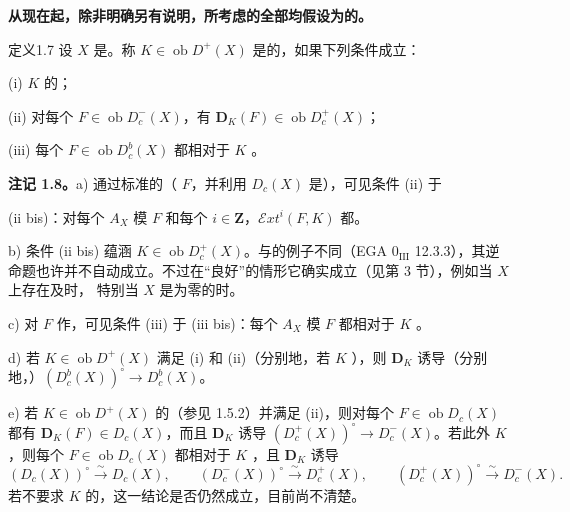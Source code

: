 \textbf{从现在起，除非明确另有说明，所考虑的全部均假设为的。}

\begin{SGAresult}{定义}{1.7}
设 $X$ 是。称 $K\in\operatorname{ob}D^+(X)$ 是的，如果下列条件成立：

(i) $K$ 的；

(ii) 对每个 $F\in\operatorname{ob}D_c^-(X)$，有 $\mathbf D_K(F)\in\operatorname{ob}D_c^+(X)$；

(iii) 每个 $F\in\operatorname{ob}D_c^b(X)$ 都相对于 $K$ 。
\end{SGAresult}
\textbf{注记 1.8。}a) 通过标准的（ $F$，并利用 $D_c(X)$ 是），可见条件 (ii) 于

(ii bis)：对每个 $A_X$ 模 $F$ 和每个 $i\in\mathbf Z$，$\mathcal Ext^i(F,K)$ 都。

b) 条件 (ii bis) 蕴涵 $K\in\operatorname{ob}D_c^+(X)$。与的例子不同（EGA $0_{\mathrm{III}}$ 12.3.3），其逆命题也许并不自动成立。不过在“良好”的情形它确实成立（见第 3 节），例如当 $X$ 上存在及时，
特别当 $X$ 是为零的时。

c) 对 $F$ 作，可见条件 (iii) 于 (iii bis)：每个 $A_X$ 模 $F$ 都相对于 $K$ 。

d) 若 $K\in\operatorname{ob}D^+(X)$ 满足 (i) 和 (ii)（分别地，若 $K$ ），则 $\mathbf D_K$ 诱导（分别地，）$(D_c^b(X))^\circ\longrightarrow D_c^b(X)$。

e) 若 $K\in\operatorname{ob}D^+(X)$ 的（参见 1.5.2）并满足 (ii)，则对每个 $F\in\operatorname{ob}D_c(X)$ 都有 $\mathbf D_K(F)\in D_c(X)$，而且 $\mathbf D_K$ 诱导 $(D_c^+(X))^\circ\longrightarrow D_c^-(X)$。若此外 $K$ ，则每个 $F\in\operatorname{ob}D_c(X)$ 都相对于 $K$ ，且 $\mathbf D_K$ 诱导
\[
 (D_c(X))^\circ\xrightarrow{\sim}D_c(X),\qquad
 (D_c^-(X))^\circ\xrightarrow{\sim}D_c^+(X),\qquad
 (D_c^+(X))^\circ\xrightarrow{\sim}D_c^-(X).
\]
若不要求 $K$ 的，这一结论是否仍然成立，目前尚不清楚。

